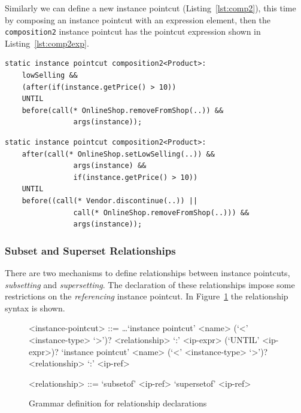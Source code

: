 \documentclass{acm_proc_article-sp}
\begin{document}
Similarly we can define a new instance pointcut (Listing~\ref{lst:comp2}), this time by composing an instance pointcut with an expression element, then the \texttt{composition2} instance pointcut has the pointcut expression shown in Listing~\ref{lst:comp2exp}.

\begin{lstlisting}[float=h!, caption={An instance pointcut and an expression is composed}, label={lst:comp2}]
static instance pointcut composition2<Product>: 
	lowSelling && 
	(after(if(instance.getPrice() > 10)) 
	UNTIL 
	before(call(* OnlineShop.removeFromShop(..)) && 
				args(instance));
\end{lstlisting}


\begin{lstlisting}[float=h!, caption={The composition2 instance pointcut after composition}, label={lst:comp2exp}]
static instance pointcut composition2<Product>: 
	after(call(* OnlineShop.setLowSelling(..)) && 
				args(instance) && 
				if(instance.getPrice() > 10)) 
	UNTIL
	before((call(* Vendor.discontinue(..)) || 
				call(* OnlineShop.removeFromShop(..))) && 
				args(instance));
\end{lstlisting}



\subsubsection{Subset and Superset Relationships}
There are two mechanisms to define relationships between instance pointcuts, \emph{subsetting} and \emph{supersetting}. The declaration of these relationships impose some restrictions on the \emph{referencing} instance pointcut. In Figure~\ref{fig:grammar3} the relationship syntax is shown.

\begin{figure}[h]
\begin{grammar}
<instance-pointcut> ::= \ldots \alt `instance pointcut' <name> (`<' <instance-type> `>')? <relationship> `:' <ip-expr> (`UNTIL' <ip-expr>)?  \alt
	`instance pointcut' <name> (`<' <instance-type> `>')? <relationship> `:' <ip-ref>

<relationship> ::= `subsetof' <ip-ref> \alt `supersetof' <ip-ref>
\end{grammar}
\caption{Grammar definition for relationship declarations}
\label{fig:grammar3}
\end{figure}
\end{document}
